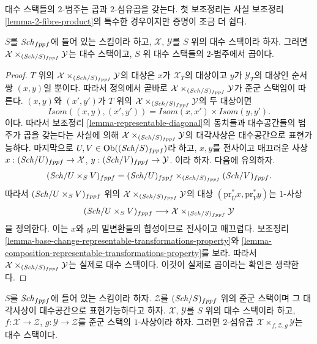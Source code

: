 \noindent
대수 스택들의 $2$-범주는 곱과 $2$-섬유곱을 갖는다. 첫 보조정리는 사실
보조정리 \ref{lemma-2-fibre-product}의 특수한 경우이지만 증명이 조금 더
쉽다.

\begin{lemma}
\label{lemma-product-spaces}
$S$를 $\mathit{Sch}_{fppf}$에 들어 있는 스킴이라 하고, $\mathcal{X}$,
$\mathcal{Y}$를 $S$ 위의 대수 스택이라 하자. 그러면
$\mathcal{X} \times_{(\mathit{Sch}/S)_{fppf}} \mathcal{Y}$는 대수 스택이고,
$S$ 위 대수 스택들의 $2$-범주에서 곱이다.
\end{lemma}

\begin{proof}
$T$ 위의 $\mathcal{X} \times_{(\mathit{Sch}/S)_{fppf}} \mathcal{Y}$의 대상은
$x$가 $\mathcal{X}_T$의 대상이고 $y$가 $\mathcal{Y}_T$의 대상인 순서쌍
$(x, y)$일 뿐이다. 따라서 정의에서 곧바로
$\mathcal{X} \times_{(\mathit{Sch}/S)_{fppf}} \mathcal{Y}$가 준군 스택임이
따른다. $(x, y)$와 $(x', y')$가 $T$ 위의
$\mathcal{X} \times_{(\mathit{Sch}/S)_{fppf}} \mathcal{Y}$의 두 대상이면
$$
\mathit{Isom}((x, y), (x', y')) =
\mathit{Isom}(x, x') \times \mathit{Isom}(y, y').
$$
이다. 따라서 보조정리 \ref{lemma-representable-diagonal}의 동치들과
대수공간들의 범주가 곱을 갖는다는 사실에 의해
$\mathcal{X} \times_{(\mathit{Sch}/S)_{fppf}} \mathcal{Y}$의 대각사상은
대수공간으로 표현가능하다. 마지막으로
$U, V \in \mathop{\mathrm{Ob}}\nolimits((\mathit{Sch}/S)_{fppf})$라 하고, $x, y$를 전사이고 매끄러운
사상
$x : (\mathit{Sch}/U)_{fppf} \to \mathcal{X}$,
$y : (\mathit{Sch}/V)_{fppf} \to \mathcal{Y}$.
이라 하자. 다음에 유의하자.
$$
(\mathit{Sch}/U \times_S V)_{fppf} =
(\mathit{Sch}/U)_{fppf}
\times_{(\mathit{Sch}/S)_{fppf}} (\mathit{Sch}/V)_{fppf}.
$$
따라서 $(\mathit{Sch}/U \times_S V)_{fppf}$ 위의
$\mathcal{X} \times_{(\mathit{Sch}/S)_{fppf}} \mathcal{Y}$의 대상
$(\text{pr}_U^*x, \text{pr}_V^*y)$는 $1$-사상
$$
(\mathit{Sch}/U \times_S V)_{fppf}
\longrightarrow
\mathcal{X} \times_{(\mathit{Sch}/S)_{fppf}} \mathcal{Y}
$$
을 정의한다. 이는 $x$와 $y$의 밑변환들의 합성이므로 전사이고
매끄럽다. 보조정리
\ref{lemma-base-change-representable-transformations-property}와
\ref{lemma-composition-representable-transformations-property}를 보라.
따라서 $\mathcal{X} \times_{(\mathit{Sch}/S)_{fppf}} \mathcal{Y}$는 실제로
대수 스택이다. 이것이 실제로 곱이라는 확인은 생략한다.
\end{proof}

\begin{lemma}
\label{lemma-2-fibre-product-general}
$S$를 $\mathit{Sch}_{fppf}$에 들어 있는 스킴이라 하자. $\mathcal{Z}$를
$(\mathit{Sch}/S)_{fppf}$ 위의 준군 스택이며 그 대각사상이 대수공간으로
표현가능하다고 하자. $\mathcal{X}$, $\mathcal{Y}$를 $S$ 위의 대수
스택이라 하고, $f : \mathcal{X} \to \mathcal{Z}$,
$g : \mathcal{Y} \to \mathcal{Z}$를 준군 스택의 $1$-사상이라 하자.
그러면 $2$-섬유곱 $\mathcal{X} \times_{f, \mathcal{Z}, g} \mathcal{Y}$는
대수 스택이다.
\end{lemma}

